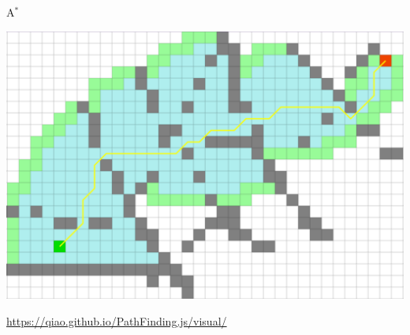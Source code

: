 \begin{frame}{A$^*$}

    \begin{adjustbox}{scale=0.7,center,margin={0cm,0cm,0cm,0cm}}
        \includegraphics[width=1\textwidth]{image/png/a_star_search.png}
    \end{adjustbox}

    \vspace{-0.5cm}
    \begin{center}
        \href{https://qiao.github.io/PathFinding.js/visual/}{https://qiao.github.io/PathFinding.js/visual/}
    \end{center}
    
\end{frame}

